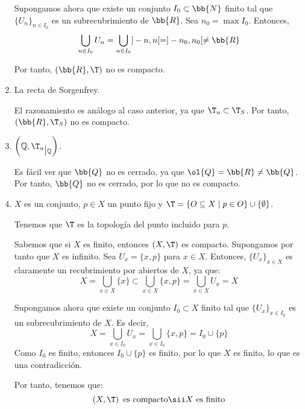 \begin{ejercicio}
\begin{enumerate}
    Supongamos ahora que existe un conjunto $I_0\subset \bb{N}$ finito tal que $\{U_n\}_{n\in I_0}$ es un subrecubrimiento de $\bb{R}$.
    Sea $n_0=\max I_0$. Entonces,
    \begin{equation*}
        \bigcup_{n\in I_0} U_n = \bigcup_{n\in I_0} ]-n,n[ = ]-n_0,n_0[ \neq \bb{R}
    \end{equation*}

    Por tanto, $(\bb{R}, \T)$ no es compacto.
    
    \item La recta de Sorgenfrey.
    
    El razonamiento es análogo al caso anterior, ya que $\T_u\subset \T_S$. Por tanto, $(\bb{R}, \T_S)$ no es compacto.

    \item $\left(\mathbb{Q}, {\T_u}_{\big |\mathbb{Q}}\right)$.
    
    Es fácil ver que $\bb{Q}$ no es cerrado, ya que $\ol{Q}= \bb{R}\neq \bb{Q}$. Por tanto, $\bb{Q}$ no es cerrado, por lo que no es compacto.

    \item $X $ es un conjunto, $ p \in X $ un punto fijo y $ \T = \{O \subseteq X \mid p \in O\} \cup \{\emptyset\}$.
    
    Tenemos que $\T$ es la topología del punto incluido para $p$.
    
    Sabemos que si $X$ es finito, entonces $(X,\T)$ es compacto. Supongamos por tanto que $X$ es infinito. 
    Sea $U_x = \{x,p\}$ para $x\in X$. Entonces, $\{U_x\}_{x\in X}$ es claramente un recubrimiento por abiertos de $X$, ya que:
    \begin{equation*}
        X = \bigcup_{x\in X} \{x\} \subset \bigcup_{x\in X} \{x,p\} = \bigcup_{x\in X} U_x = X
    \end{equation*}

    Supongamos ahora que existe un conjunto $I_0\subset X$ finito tal que $\{U_x\}_{x\in I_0}$ es un subrecubrimiento de $X$. Es decir,
    \begin{equation*}
        X = \bigcup_{x\in I_0} U_x = \bigcup_{x\in I_0} \{x,p\} = I_0 \cup \{p\}
    \end{equation*}
    Como $I_0$ es finito, entonces $I_0\cup \{p\}$ es finito, por lo que $X$ es finito, lo que es una contradicción.

    Por tanto, tenemos que:
    \begin{equation*}
        \left(X, \T\right) \text{ es compacto} \sii X \text{ es finito}
    \end{equation*}


\end{enumerate}
\end{ejercicio}
